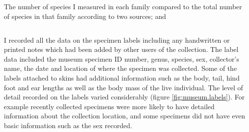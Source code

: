 \begin{table}[h]
	\caption[Species measured] 
	{The number of species I measured in each family compared to the total number of species in that family according to two sources; \citep{Wilson2005} and \citep{IUCN2012}}
		
	\label{tab:species.measured}
\end{table}
 





\subsection{}

	I recorded all the data on the specimen labels including any handwritten or printed notes which had been added by other users of the collection. The label data included the museum specimen ID number, genus, species, sex, collector’s name, the date and location of where the specimen was collected. Some of the labels attached to skins had additional information such as the body, tail, hind foot and ear lengths as well as the body mass of the live individual. 
	The level of detail recorded on the labels varied considerably (figure \ref{fig:museum.labels}). For example recently collected specimens were more likely to have detailed information about the collection location, and some specimens did not have even basic information such as the sex recorded. 


